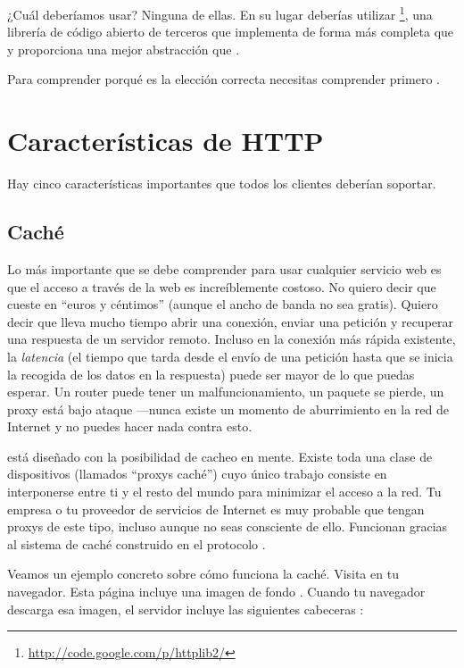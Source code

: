 ¿Cuál deberíamos usar? Ninguna de ellas. En su lugar deberías utilizar \footnote{\href{http://code.google.com/p/httplib2/}{http://code.google.com/p/httplib2/}}, una librería de código abierto de terceros que implementa  de forma más completa que  y proporciona una mejor abstracción que .

Para comprender porqué  es la elección correcta necesitas comprender primero .

\section{Características de HTTP}

Hay cinco características importantes que todos los clientes  deberían soportar.

\subsection{Caché}

Lo más importante que se debe comprender para usar cualquier servicio web es que el acceso a través de la web es increíblemente costoso. No quiero decir que cueste en ``euros y céntimos'' (aunque el ancho de banda no sea gratis). Quiero decir que lleva mucho tiempo abrir una conexión, enviar una petición y recuperar una respuesta de un servidor remoto. Incluso en la conexión más rápida existente, la \emph{latencia} (el tiempo que tarda desde el envío de una petición hasta que se inicia la recogida de los datos en la respuesta) puede ser mayor de lo que puedas esperar. Un router puede tener un malfuncionamiento, un paquete se pierde, un proxy está bajo ataque ---nunca existe un momento de aburrimiento en la red de Internet y no puedes hacer nada contra esto.


 está diseñado con la posibilidad de cacheo en mente. Existe toda una clase de dispositivos (llamados ``proxys caché'') cuyo único trabajo consiste en interponerse entre ti y el resto del mundo para minimizar el acceso a la red. Tu empresa o tu proveedor de servicios de Internet es muy probable que tengan proxys de este tipo, incluso aunque no seas consciente de ello. Funcionan gracias al sistema de caché construido en el protocolo .

Veamos un ejemplo concreto sobre cómo funciona la caché. Visita  en tu navegador. Esta página incluye una imagen de fondo . Cuando tu navegador descarga esa imagen, el servidor incluye las siguientes cabeceras :

